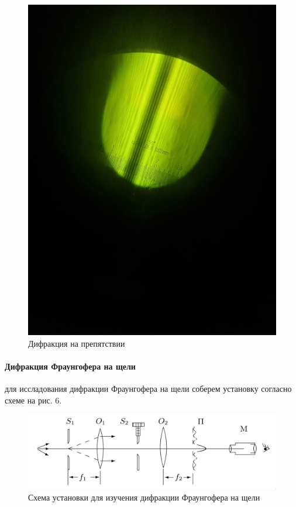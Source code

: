 \documentclass[a4paper,12pt]{article}
\begin{document}
\begin{figure}[H]
    \centering
    \includegraphics[scale=0.2]{pic_3.png}
    \caption{Дифракция на препятствии}
\end{figure}

\newpage
\paragraph{Дифракция Фраунгофера на щели} для иссладования дифракции Фраунгофера на щели соберем установку согласно схеме на рис. 6.

\begin{figure}[H]
    \centering
    \includegraphics[scale=0.3]{lab_2.png}
    \caption{Схема установки для изучения дифракции Фраунгофера на щели}
\end{figure}
\end{document}
